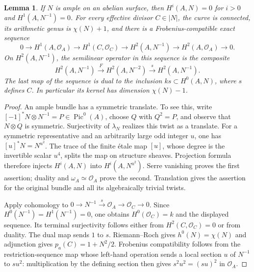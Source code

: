 \documentclass[11pt]{article}
\newtheorem{lemma}[theorem]{Lemma}
\theoremstyle{definition}\newtheorem{definition}[theorem]{Definition}
\theoremstyle{remark}\newtheorem{remark}[theorem]{Remark}
\newcommand{\OO}{\mathcal O}
\newcommand{\Pic}{\operatorname{Pic}}
\begin{document}
\begin{lemma}\label{lem:cohomology}
If $N$ is ample on an abelian surface, then $H^i(A,N)=0$ for $i>0$ and $H^1(A,N^{-1})=0$. For every effective divisor $C\in|N|$, the curve is connected, its arithmetic genus is $\chi(N)+1$, and there is a Frobenius-compatible exact sequence
\begin{equation}\label{eq:relative}
 0\longrightarrow H^1(A,\OO_A)\longrightarrow H^1(C,\OO_C)
 \longrightarrow H^2(A,N^{-1})\longrightarrow H^2(A,\OO_A)
 \longrightarrow0.
\end{equation}
On $H^2(A,N^{-1})$, the semilinear operator in this sequence is the composite
\[
 H^2(A,N^{-1})\xrightarrow{F}H^2(A,N^{-2})\xrightarrow{\,s\,}H^2(A,N^{-1}).
\]
The last map of the sequence is dual to the inclusion $k s\subset H^0(A,N)$, where $s$ defines $C$. In particular its kernel has dimension $\chi(N)-1$.
\end{lemma}
\begin{proof}
An ample bundle has a symmetric translate. To see this, write $[-1]^*N\otimes N^{-1}=P\in\Pic^0(A)$, choose $Q$ with $Q^2=P$, and observe that $N\otimes Q$ is symmetric. Surjectivity of $\lambda_N$ realizes this twist as a translate. For a symmetric representative and an arbitrarily large odd integer $u$, one has $[u]^*N=N^{u^2}$. The trace of the finite \'etale map $[u]$, whose degree is the invertible scalar $u^4$, splits the map on structure sheaves. Projection formula therefore injects $H^i(A,N)$ into $H^i(A,N^{u^2})$. Serre vanishing proves the first assertion; duality and $\omega_A\simeq\OO_A$ prove the second. Translation gives the assertion for the original bundle and all its algebraically trivial twists.

Apply cohomology to $0\to N^{-1}\xrightarrow{s}\OO_A\to\OO_C\to0$. Since $H^0(N^{-1})=H^1(N^{-1})=0$, one obtains $H^0(\OO_C)=k$ and the displayed sequence. Its terminal surjectivity follows either from $H^2(C,\OO_C)=0$ or from duality. The dual map sends $1$ to $s$. Riemann--Roch gives $h^0(N)=\chi(N)$ and adjunction gives $p_a(C)=1+N^2/2$. Frobenius compatibility follows from the restriction-sequence map whose left-hand operation sends a local section $u$ of $N^{-1}$ to $s u^2$: multiplication by the defining section then gives $s^2u^2=(su)^2$ in $\OO_A$.
\end{proof}
\end{document}

